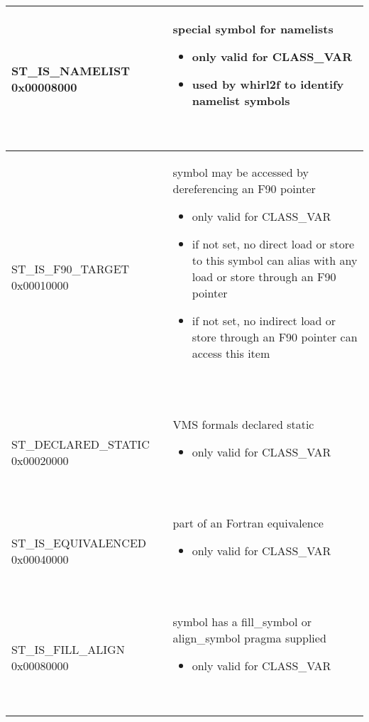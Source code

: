 \begin{longtable}{|p{2in}|p{4in}|}
\index{ST\_IS\_NAMELIST}%
ST\_IS\_NAMELIST 0x00008000 & 
\begin{minipage}{4in}
\flushleft
special symbol for namelists 
\begin{itemize}
\item only valid for
\index{CLASS\_VAR}%
CLASS\_VAR
\item used by whirl2f to identify namelist symbols
\end{itemize}
~
\end{minipage}\\\hline

\index{ST\_IS\_F90\_TARGET}%
ST\_IS\_F90\_TARGET 0x00010000 & 
\begin{minipage}{4in}
\flushleft
symbol may be accessed by dereferencing an F90 pointer 
\begin{itemize}
\item only valid for
\index{CLASS\_VAR}%
CLASS\_VAR
\item if not set, no direct load or store to this symbol can alias
  with any load or store through an F90 pointer
\item if not set, no indirect load or store through an F90 pointer can
  access this item
\end{itemize}
~
\end{minipage}\\\hline

\index{ST\_DECLARED\_STATIC}%
ST\_DECLARED\_STATIC  0x00020000 &
\begin{minipage}{4in}
\flushleft
VMS formals declared static
\begin{itemize}
\item only valid for
\index{CLASS\_VAR}%
CLASS\_VAR
\end{itemize}
~
\end{minipage}\\\hline

\index{ST\_IS\_EQUIVALENCED}%
ST\_IS\_EQUIVALENCED  0x00040000 & 
\begin{minipage}{4in}
\flushleft
part of an Fortran equivalence
\begin{itemize}
\item only valid for
\index{CLASS\_VAR}%
CLASS\_VAR
\end{itemize}
~
\end{minipage}\\\hline

\index{ST\_IS\_FILL\_ALIGN}%
ST\_IS\_FILL\_ALIGN  0x00080000 & 
\begin{minipage}{4in}
\flushleft
symbol has a fill\_symbol or align\_symbol pragma supplied
\begin{itemize}
\item only valid for
\index{CLASS\_VAR}%
CLASS\_VAR
\end{itemize}
~
\end{minipage}\\\hline


\end{longtable}
